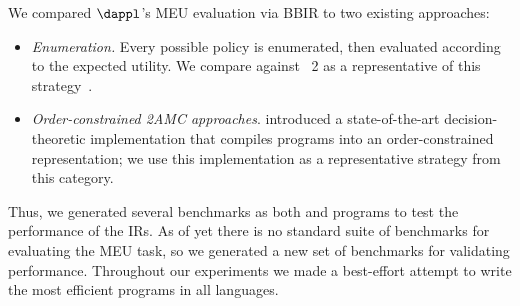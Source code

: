 We compared $\dappl$'s MEU evaluation via BBIR to two existing approaches:

\begin{itemize}[leftmargin=*]
  \item \textit{Enumeration.}
  Every possible policy is enumerated, then evaluated according to the expected utility.
  We compare against \problog~2 as a representative of this strategy~\citep{de2007problog}.
  \item \textit{Order-constrained 2AMC approaches}.
  \citet{derkinderen2020algebraic} introduced a state-of-the-art decision-theoretic \problog{}
  implementation that
  compiles programs into an order-constrained representation;
  we use this implementation as a representative strategy from this category.
\end{itemize}


Thus, we generated several benchmarks as both \dappl{} and \problog{} programs
to test the performance of the IRs.  As of yet there is no standard suite of
benchmarks for evaluating the MEU task, so we generated a new set of benchmarks
for validating performance.  Throughout our experiments we made a
best-effort attempt to write the most efficient programs in all languages.

